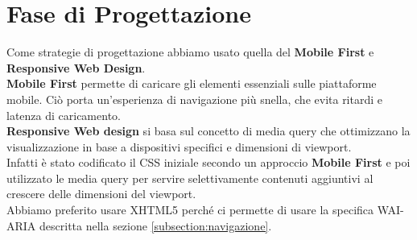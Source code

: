 \section{Fase di Progettazione}
Come strategie di progettazione abbiamo usato quella del \textbf{Mobile First} e \textbf{Responsive Web Design}.\\
\textbf{Mobile First} permette di caricare gli elementi essenziali sulle piattaforme mobile. Ciò porta un'esperienza di navigazione più snella, che evita ritardi e latenza di caricamento.\\
\textbf{Responsive Web design} si basa sul concetto di media query che ottimizzano la visualizzazione in base a dispositivi specifici e dimensioni di viewport.\\
Infatti è stato codificato il CSS iniziale secondo un approccio \textbf{Mobile First} e poi utilizzato le media query per servire selettivamente contenuti aggiuntivi al crescere delle dimensioni del viewport.\\
Abbiamo preferito usare XHTML5 perché ci permette di usare la specifica WAI-ARIA descritta nella sezione \ref{subsection:navigazione}.

